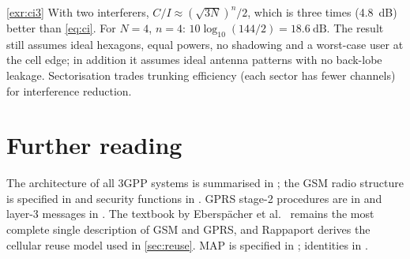 \documentclass[11pt,a4paper]{article}
\begin{document}
\begin{solutionbox}{\ref{exr:ci3}}
With two interferers, $C/I \approx (\sqrt{3N})^n/2$, which is three times (\qty{4.8}{\dB})
better than \cref{eq:ci}. For $N=4$, $n=4$: $10\log_{10}(144/2) = \qty{18.6}{\dB}$. The
result still assumes ideal hexagons, equal powers, no shadowing and a worst-case
user at the cell edge; in addition it assumes ideal antenna patterns with no
back-lobe leakage. Sectorisation trades trunking efficiency (each sector has fewer
channels) for interference reduction.
\end{solutionbox}

\section{Further reading}\label{sec:reading}
The architecture of all 3GPP systems is summarised in \cite{ts23002}; the GSM radio
structure is specified in \cite{ts45002} and security functions in \cite{ts43020}.
GPRS stage-2 procedures are in \cite{ts23060} and layer-3 messages in \cite{ts24008}.
The textbook by Eberspächer et al.\ \cite{eberspaecher2009gsm} remains the most
complete single description of GSM and GPRS, and Rappaport \cite{rappaport2002wireless}
derives the cellular reuse model used in \cref{sec:reuse}. MAP is specified in
\cite{ts29002}; identities in \cite{ts23003}.

\nocite{shannon1948mathematical}
\printbibliography[heading=subbibliography,title={\ACNstrRefs}]
\end{document}
